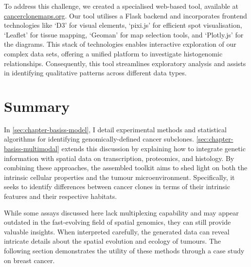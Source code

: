 To address this challenge, we created a specialised web-based tool, available at \href{https://www.cancerclonemaps.org/}{cancerclonemaps.org}. Our tool utilises a Flask backend and incorporates frontend technologies like `D3' for visual elements, `pixi.js' for efficient spot visualisation, `Leaflet' for tissue mapping, `Geoman' for map selection tools, and `Plotly.js' for the diagrams. This stack of technologies enables interactive exploration of our complex data sets, offering a unified platform to investigate histogenomic relationships. Consequently, this tool streamlines exploratory analysis and assists in identifying qualitative patterns across different data types.

\section{Summary}
\label{sec:modalities-summary}

In \cref{sec:chapter-basiss-model}, I detail experimental methods and statistical algorithms for identifying genomically-defined cancer subclones. \cref{sec:chapter-basiss-multimodal} extends this discussion by explaining how to integrate genetic information with spatial data on transcription, proteomics, and histology. By combining these approaches, the assembled toolkit aims to shed light on both the intrinsic cellular properties and the tumour microenvironment. Specifically, it seeks to identify differences between cancer clones in terms of their intrinsic features and their respective habitats.

While some assays discussed here lack multiplexing capability and may appear outdated in the fast-evolving field of spatial genomics, they can still provide valuable insights. When interpreted carefully, the generated data can reveal intricate details about the spatial evolution and ecology of tumours. The following section  demonstrates the utility of these methods through a case study on breast cancer.